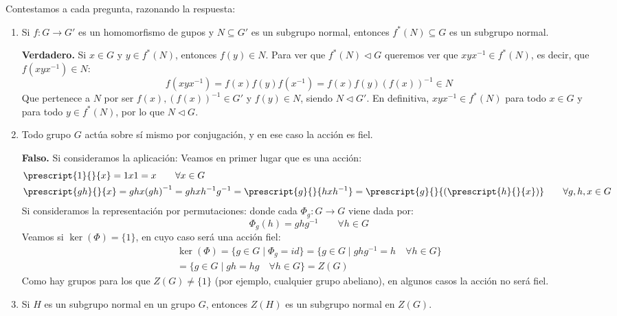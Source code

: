 \documentclass[12pt]{article}
\begin{document}
    \newpage
    \setcounter{ejercicio}{0}
    \begin{ejercicio}[5 puntos]
        Contestamos a cada pregunta, razonando la respuesta:
        \begin{enumerate}
            \item Si $f:G\to G'$ es un homomorfismo de gupos y $N\subseteq G'$ es un subgrupo normal, entonces $f^\ast(N)\subseteq G$ es un subgrupo normal.

                \textbf{Verdadero.} Si $x\in G$ y $y\in f^\ast(N)$, entonces $f(y) \in N$. Para ver que $f^\ast(N)\lhd G$ queremos ver que $xyx^{-1}\in f^\ast(N)$, es decir, que $f(xyx^{-1})\in N$:
                \begin{equation*}
                    f(xyx^{-1}) = f(x)f(y)f(x^{-1}) = f(x)f(y){(f(x))}^{-1} \in N
                \end{equation*}
                Que pertenece a $N$ por ser $f(x),{(f(x))}^{-1}\in G'$ y $f(y)\in N$, siendo $N\lhd G'$. En definitiva, $xyx^{-1}\in f^\ast(N)$ para todo $x\in G$ y para todo $y\in f^\ast(N)$, por lo que $N\lhd G$.
            \item Todo grupo $G$ actúa sobre sí mismo por conjugación, y en ese caso la acción es fiel.

                \textbf{Falso.} Si consideramos la aplicación:
                Veamos en primer lugar que es una acción:
                \begin{align*}
                    &\prescript{1}{}{x} = 1x1 = x \qquad \forall x\in G \\
                    &\prescript{gh}{}{x} = ghx{(gh)}^{-1} = ghxh^{-1}g^{-1} = \prescript{g}{}{hxh^{-1}} = \prescript{g}{}{(\prescript{h}{}{x})} \qquad \forall g,h,x\in G
                \end{align*}
                Si consideramos la representación por permutaciones:
                donde cada $\Phi_g:G\to G$ viene dada por:
                \begin{equation*}
                    \Phi_g(h) = ghg^{-1} \qquad \forall h\in G
                \end{equation*}
                Veamos si $\ker(\Phi) = \{1\}$, en cuyo caso será una acción fiel:
                \begin{multline*}
                    \ker(\Phi) = \{g\in G \mid \Phi_g = id\} = \{g\in G \mid ghg^{-1} = h \quad \forall h\in G\} \\ = \{g\in G \mid gh = hg \quad \forall h\in G\} = Z(G)
                \end{multline*}
                Como hay grupos para los que $Z(G) \neq \{1\}$ (por ejemplo, cualquier grupo abeliano), en algunos casos la acción no será fiel.
            \item Si $H$ es un subgrupo normal en un grupo $G$, entonces $Z(H)$ es un subgrupo normal en $Z(G)$.
                

\end{enumerate}
\end{ejercicio}
\end{document}
